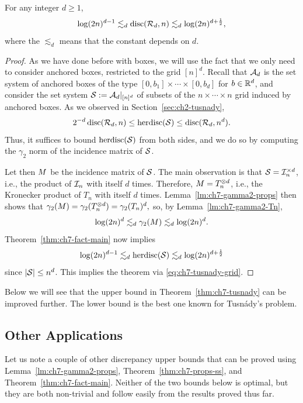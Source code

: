 \begin{theorem}\label{thm:ch7-tusnady}
  For any integer $d \ge 1$,
  \[
    \log(2n)^{d-1} \lesssim_d \disc(\RR_d,n) \lesssim_d \log(2n)^{d+\frac12},
  \]
  where the $\lesssim_d$ means that the constant
  depends on $d$.
\end{theorem}
\begin{proof}
  As we have done before with boxes, we will use the fact that we only
  need to consider anchored boxes, restricted to the grid
  $[n]^d$. Recall that $\AA_d$ is the set system of anchored boxes of the type $[0,b_1]\times\cdots \times [0,b_d]$ for $b \in \R^d$, and consider
  the set system $\SS \eqdef \AA_d|_{[n]^d}$ of subsets of the
  $n\times \cdots \times n$ grid induced by anchored boxes. As we observed in Section~\ref{sec:ch2-tusnady},
  \begin{equation}\label{eq:ch7-tusnady-grid}
   2^{-d}\disc(\RR_d,n) \le \herdisc(\SS) \le \disc(\RR_d,n^d).
 \end{equation}
  Thus, it suffices to bound $\herdisc(\SS)$ from
  both sides, and we do so by computing the $\gamma_2$ norm of the
  incidence matrix of $\SS$.

  Let then $\mat$ be the incidence matrix of $\SS$. The main
  observation is that $\SS = \II_n^{\times d}$, i.e., the product of
  $\II_n$ with itself $d$ times. Therefore,  $\mat =
  T_n^{\otimes d}$, i.e., the Kronecker
  product of $T_n$ with itself $d$
  times. Lemma~\ref{lm:ch7-gamma2-props} then shows that
  \(
  \gamma_2(\mat) = \gamma_2(T_n^{\otimes d}) = \gamma_2(T_n)^d,
  \)
  so, by Lemma~\ref{lm:ch7-gamma2-Tn}, 
  \begin{equation}\label{eq:ch7-gamma2-tusnady}
    \log(2n)^d \lesssim_d \gamma_2(\mat) \lesssim_d \log(2n)^d.
  \end{equation}
  Theorem~\ref{thm:ch7-fact-main} now implies
  \[
    \log(2n)^{d-1} \lesssim_d \herdisc(\SS) \lesssim_d \log(2n)^{d+\frac12}
  \]
  since $|\SS| \le n^d$. This implies the theorem via
  \eqref{eq:ch7-tusnady-grid}.
\end{proof}

Below we will see that the upper bound in
Theorem~\ref{thm:ch7-tusnady} can be improved further. The lower bound
is the best one known for Tusn\'ady's problem.

\subsection{Other Applications}

Let us note a couple of other discrepancy upper bounds that can be
proved using Lemma~\ref{lm:ch7-gamma2-props},
Theorem~\ref{thm:ch7-props-ss}, and
Theorem~\ref{thm:ch7-fact-main}. Neither of the two bounds below is
optimal, but they are both non-trivial and follow easily from the
results proved thus far.

